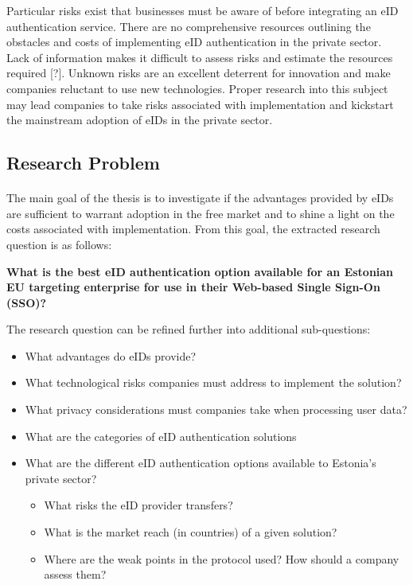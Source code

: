 Particular risks exist that businesses must be aware of before integrating an eID authentication service. There are no comprehensive resources outlining the obstacles and costs of implementing eID authentication in the private sector. Lack of information makes it difficult to assess risks and estimate the resources required [?]. Unknown risks are an excellent deterrent for innovation and make companies reluctant to use new technologies. Proper research into this subject may lead companies to take risks associated with implementation and kickstart the mainstream adoption of eIDs in the private sector. 

\subsection{Research Problem}
\paragraph{}

The main goal of the thesis is to investigate if the advantages provided by eIDs are sufficient to warrant adoption in the free market and to shine a light on the costs associated with implementation. From this goal, the extracted research question is as follows: 

\textbf{What is the best eID authentication option available for an Estonian EU targeting enterprise for use in their Web-based Single Sign-On (SSO)?}

The research question can be refined further into additional sub-questions:

\begin{itemize}
    \item What advantages do eIDs provide?
    \item What technological risks companies must address to implement the solution?
    \item What privacy considerations must companies take when processing user data?
    \item What are the categories of eID authentication solutions
    \item What are the different eID authentication options available to Estonia's private sector?
    \begin{itemize}
        \item What risks the eID provider transfers?
        \item What is the market reach (in countries) of a given solution?
        \item Where are the weak points in the protocol used? How should a company assess them?
    \end{itemize}
\end{itemize}

